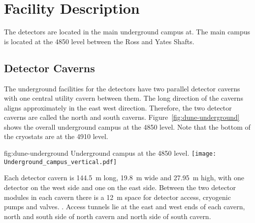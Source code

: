\chapter{Facility Description}
\label{vl:tc-facility}

The  detectors are located in the main underground campus at. The main campus is located at the 4850 level between the Ross and Yates Shafts.  

\section{Detector Caverns}
\label{sec:fdsp-coord-faci-caverns}


The underground facilities for the  detectors have two parallel
detector caverns with one central utility cavern between them. The
long direction of the caverns aligns approximately in the 
east west direction. Therefore, the two detector caverns are called the north
and south caverns. Figure~\ref{fig:dune-underground} shows the overall
underground campus at the  4850 level. Note that the bottom of the cryostats are at the 4910 level.
\begin{dunefigure}{fig:dune-underground}
  {Underground campus at the 4850 level.}
  \texttt{[image: Underground\_campus\_vertical.pdf]}
\end{dunefigure}
Each detector cavern is \SI{144.5}{\meter} long, \SI{19.8}{\meter}
wide and \SI{27.95}{\meter} high, with one detector on the west side
and one on the east side. Between the two detector modules in each
cavern there is a \SI{12}{\meter} space for detector access, cryogenic pumps and valves.
. Access tunnels lie at the east and
west ends of each cavern, north and south side of north cavern and
north side of south cavern.

